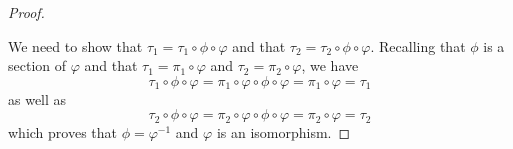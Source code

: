 \documentclass{article}
\begin{document}
\begin{proof}
\begin{center}
    \end{center}
    We need to show that $\tau_1=\tau_1\circ \phi\circ \varphi$ and that $\tau_2=\tau_2\circ\phi\circ \varphi$. Recalling that $\phi$ is a section of $\varphi$ and that $\tau_1=\pi_1\circ \varphi$ and $\tau_2=\pi_2\circ \varphi$, we have
    \[
    \tau_1\circ \phi\circ \varphi=\pi_1\circ \varphi \circ \phi \circ \varphi =\pi_1\circ \varphi=\tau_1
    \]
    as well as
    \[
    \tau_2 \circ \phi \circ \varphi=\pi_2\circ \varphi \circ \phi \circ \varphi=\pi_2\circ \varphi=\tau_2
    \]
    which proves that $\phi=\varphi^{-1}$ and $\varphi$ is an isomorphism.
\end{proof}
\end{document}
